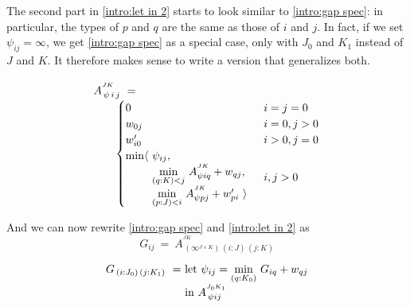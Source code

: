 \medskip
The second part in \eqref{intro:let in 2} starts to look similar to \eqref{intro:gap spec}:
in particular, the types of $p$ and $q$ are the same as those of $i$ and $j$.
In fact, if we set $\psi_{ij}=\infty$, we get \eqref{intro:gap spec} as a special case,
only with $J_0$ and $K_1$ instead of $J$ and $K$.
It therefore makes sense to write a version that generalizes both.

\begin{equation}\LeftEqNo
\renewcommand\arraystretch{1.5}
\begin{array}{l}
	A^{^{JK}}_{\,\psi\, i\, j} ~=~  \\
	\qquad
	\begin{cases}
		0                        & i=j=0 \\
		w_{0j}                   & i=0, j>0 \\
		w'_{i0}                  & i>0, j=0 \\
		\begin{array}{@{}l@{~}l}
		  \min\langle & \psi_{ij}, \\
		              & \underset{(q:K)<j}\min ~ A^{^{JK}}_{\psi iq} + w_{qj}, \\
		              & \underset{(p:J)<i}\min ~ A^{^{JK}}_{\psi pj} + w'_{pi}~\rangle
		\end{array}              & i,j>0
	\end{cases}
\end{array}
\label{intro:gap phase A}
\end{equation}

\medskip
And we can now rewrite \eqref{intro:gap spec} and \eqref{intro:let in 2} as
%
\begin{equation}
	G_{ij} ~=~ A^{^{JK}}_{\,(\infty^{J\times K})\,(i:J)\,(j:K)}
\end{equation}
%
\begin{equation}
\renewcommand\arraystretch{1.3}
\begin{array}{l@{}l}
	G_{\,(i : J_0)\,(j : K_1)} ~=~ 
	& \textrm{let}~\psi_{ij} = \underset{(q:K_0)}\min ~ G_{iq} + w_{qj} \\
	& \textrm{in}~A^{^{J_0K_1}}_{\,\psi ij}
\end{array}	
\label{intro:let in 2 using A}
\end{equation}

\newcommand\otherwise{\textrm{\small otherwise}}

